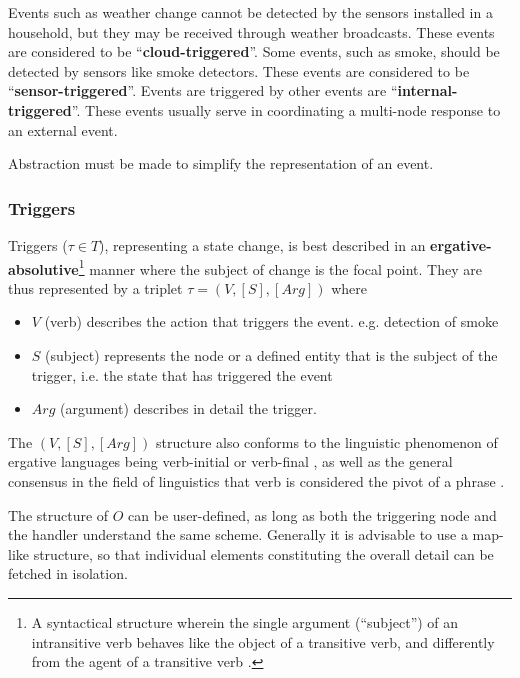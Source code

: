\documentclass[letterpaper, twocolumn, 10pt, conference]{IEEEtran}
\newcommand{\term}[1]{\textbf{#1}}
\begin{document}
Events such as weather change cannot be detected by the sensors installed in a household, but they may be received through weather broadcasts. These events are considered to be \enquote{\term{cloud-triggered}}. Some events, such as smoke, should be detected by sensors like smoke detectors. These events are considered to be \enquote{\term{sensor-triggered}}. Events are triggered by other events are \enquote{\term{internal-triggered}}. These events usually serve in coordinating a multi-node response to an external event.

Abstraction must be made to simplify the representation of an event. 

\subsubsection{Triggers} \label{sssec:triggers}

Triggers ($ \tau \in T $), representing a state change, is best described in an \term{ergative-absolutive}\footnote{A syntactical structure wherein the single argument (\enquote{subject}) of an intransitive verb behaves like the object of a transitive verb, and differently from the agent of a transitive verb \cite{comrie1989language}.} manner where the subject of change is the focal point. They are thus represented by a triplet $ \tau = (V, [S], [Arg]) $ where 
\begin{itemize}
	\setlength\itemsep{0pt}
	\item $ V $ (verb) describes the action that triggers the event. e.g. detection of smoke
	\item $ S $ (subject) represents the node or a defined entity that is the subject of the trigger, i.e. the state that has triggered the event
	\item $ Arg $ (argument) describes in detail the trigger. 
\end{itemize}

The $(V, [S], [Arg])$ structure also conforms to the linguistic phenomenon of ergative languages being verb-initial or verb-final \cite{comrie1978ergativity}, as well as the general consensus in the field of linguistics that verb is considered the pivot of a phrase \cite{lucien1959elements, chomsky2013topics}.

The structure of $ O $ can be user-defined, as long as both the triggering node and the handler understand the same scheme. Generally it is advisable to use a map-like structure, so that individual elements constituting the overall detail can be fetched in isolation.
\end{document}
